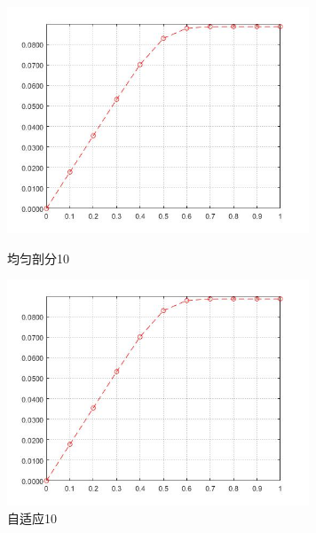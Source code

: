 \documentclass[12pt]{ctexart}
\begin{document}
\begin{figure}[H]
	\centering
	\begin{minipage}[t]{0.48\textwidth}
		\centering
		\includegraphics[width=9cm]{方程一，均匀剖分10.jpg}
		\caption{均匀剖分10}
	\end{minipage}
	\begin{minipage}[t]{0.48\textwidth}
		\centering
		\includegraphics[width=9cm]{方程一，自适应10.jpg}
		\caption{自适应10}
	\end{minipage}
\end{figure}
\end{document}
